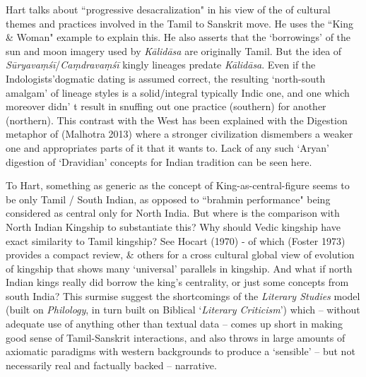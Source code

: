 Hart talks about “progressive desacralization" in his view of the of cultural themes and practices involved in the Tamil to Sanskrit move. He uses the “King \& Woman" example to explain this. He also asserts that the ‘borrowings’ of the sun and moon imagery used by \textit{Kālidāsa} are originally Tamil. But the idea of \textit{Sūryavaṃśī}/\textit{Caṃdravaṃśī} kingly lineages predate \textit{Kālidāsa}. Even if the Indologists’dogmatic dating is assumed correct, the resulting ‘north-south amalgam’ of lineage styles is a solid/integral typically Indic one, and one which moreover didn’ t result in snuffing out one practice (southern) for another (northern). This contrast with the West has been explained with the Digestion metaphor of (Malhotra 2013) where a stronger civilization dismembers a weaker one and appropriates parts of it that it wants to. Lack of any such ‘Aryan’ digestion of ‘Dravidian’ concepts for Indian tradition can be seen here.

To Hart, something as generic as the concept of King-as-central-figure seems to be only Tamil / South Indian, as opposed to “brahmin performance" being considered as central only for North India. But where is the comparison with North Indian Kingship to substantiate this? Why should Vedic kingship have exact similarity to Tamil kingship? See Hocart (1970) - of which (Foster 1973) provides a compact review, \& others for a cross cultural global view of evolution of kingship that shows many ‘universal’ parallels in kingship. And what if north Indian kings really did borrow the king’s centrality, or just some concepts from south India? This surmise suggest the shortcomings of the \textit{Literary Studies} model (built on \textit{Philology}, in turn built on Biblical ‘\textit{Literary Criticism}’) which – without adequate use of anything other than textual data – comes up short in making good sense of Tamil-Sanskrit interactions, and also throws in large amounts of axiomatic paradigms with western backgrounds to produce a ‘sensible’ – but not necessarily real and factually backed – narrative.

